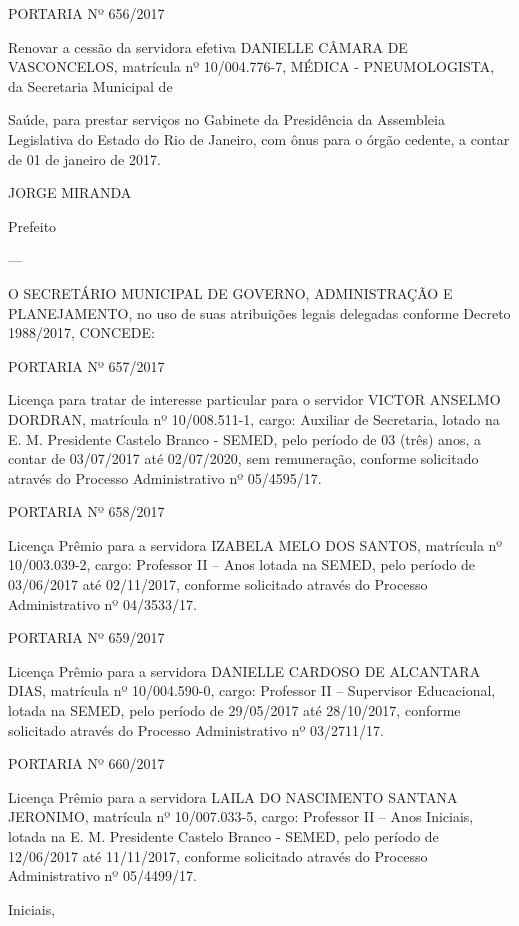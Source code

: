 \documentclass{doliberto}
\begin{document}
PORTARIA Nº 656/2017 
 
Renovar  a  cessão  da  servidora  efetiva  DANIELLE 
CÂMARA  DE  VASCONCELOS,  matrícula  nº  10/004.776-7, 
MÉDICA  -  PNEUMOLOGISTA,  da  Secretaria  Municipal  de 


Saúde, para prestar serviços no Gabinete da Presidência da 
Assembleia  Legislativa  do  Estado  do  Rio  de  Janeiro,  com 
ônus  para  o  órgão  cedente,  a  contar de 01 de janeiro de 
2017. 
 

JORGE MIRANDA 

Prefeito 

---

O  SECRETÁRIO  MUNICIPAL  DE  GOVERNO, 
ADMINISTRAÇÃO E PLANEJAMENTO, no uso de 
suas  atribuições 
legais  delegadas  conforme 
Decreto 1988/2017,  
CONCEDE: 
 
PORTARIA Nº 657/2017 
 
Licença  para  tratar  de  interesse  particular  para  o  servidor 
VICTOR ANSELMO DORDRAN, matrícula nº 10/008.511-1, 
cargo:  Auxiliar  de  Secretaria,  lotado  na  E.  M.  Presidente 
Castelo  Branco  -  SEMED,  pelo  período  de  03  (três)  anos,  a 
contar de 03/07/2017 até 02/07/2020, sem remuneração, 
conforme solicitado através do Processo Administrativo nº 
05/4595/17. 
 
PORTARIA Nº 658/2017 
 
Licença  Prêmio  para  a  servidora  IZABELA  MELO  DOS 
SANTOS,  matrícula  nº  10/003.039-2,  cargo:  Professor  II  – 
Anos 
lotada  na  SEMED,  pelo  período  de 
03/06/2017  até  02/11/2017,  conforme  solicitado  através 
do Processo Administrativo nº 04/3533/17. 
 
PORTARIA Nº 659/2017 
 
Licença Prêmio  para a servidora  DANIELLE CARDOSO  DE 
ALCANTARA  DIAS,  matrícula  nº  10/004.590-0,  cargo: 
Professor  II  –  Supervisor  Educacional,  lotada  na  SEMED, 
pelo  período  de  29/05/2017  até  28/10/2017,  conforme 
solicitado  através  do  Processo  Administrativo  nº 
03/2711/17. 
 
PORTARIA Nº 660/2017 
 
Licença  Prêmio  para  a  servidora  LAILA  DO  NASCIMENTO 
SANTANA  JERONIMO,  matrícula  nº  10/007.033-5,  cargo: 
Professor  II  –  Anos  Iniciais,  lotada  na  E.  M.  Presidente 
Castelo  Branco  -  SEMED,  pelo  período  de  12/06/2017  até 
11/11/2017,  conforme  solicitado  através  do  Processo 
Administrativo nº 05/4499/17. 

Iniciais, 
 
\end{document}
